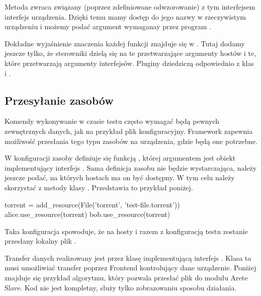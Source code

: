 \documentclass[00-praca-magisterska.tex]{subfiles}
\begin{document}
Metoda  zwraca związany (poprzez zdefiniowane
odwzorowanie) z tym interfejsem interfejs urządzenia. Dzięki temu mamy dostęp do
jego nazwy w rzeczywistym urządzeniu i możemy podać argument wymaganay przez
program .

Dokładne wyjaśnienie znaczenia każdej funkcji znajduje się w . Tutaj dodamy jeszcze tylko, że sterowniki dzielą się na te
przetwarzające argumenty hostów i te, które przetwarzają argumenty interfejsów.
Pluginy dziedziczą odpowiednio z klas  i
.

\subsection{Przesyłanie zasobów}

Komendy wykonywanie w czasie testu często wymagać będą pewnych zewnętrznych
danych, jak na przykład plik konfiguracyjny. Framework zapewnia możliwość
przesłania tego typu zasobów na urządzenia, gdzie będą one potrzebne.

W konfiguracji zasoby definiuje się funkcją , której
argumentem jest obiekt implementujący interfejs . Sama definicja
zasobu nie będzie wystarczająca, należy jeszcze podać, na których hostach ma on
być dostępny. W tym celu należy skorzystać z metody  klasy
. Przedstawia to przykład poniżej.

\begin{pythoncode}
  torrent = add_resource(File('torrent', 'test-file.torrent'))
  alice.use_resource(torrent)
  bob.use_resource(torrent)
\end{pythoncode}

Taka konfiguracja spowoduje, że na hosty  i  razem z
konfiguracją testu zostanie przesłany lokalny plik .

Transfer danych realizowany jest przez klasę implementującą interfejs
. Klasa ta musi umożliwiać transfer poprzez Frontend kontrolujący
dane urządzenie. Poniżej znajduje się przykład algorytmu, który pozwala przesłać
plik do modułu Arete Slave. Kod nie jest kompletny, służy tylko zobrazowaniu
sposobu działania.

\end{document}
